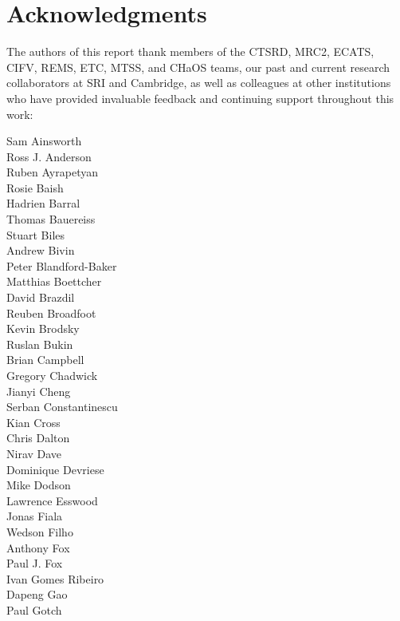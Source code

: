 \section*{Acknowledgments}

\vspace{-0.2cm}

The authors of this report thank members of the CTSRD, MRC2, ECATS,
CIFV, REMS, ETC, MTSS, and CHaOS teams, our past and current research collaborators at SRI and
Cambridge, as well as colleagues at other institutions who have provided
invaluable feedback and continuing support throughout this work:

\medskip

\begin{small}
\noindent\begin{autogrid}{4}
Sam Ainsworth \\
Ross J. Anderson \\
Ruben Ayrapetyan \\
Rosie Baish \\
Hadrien Barral \\
Thomas Bauereiss \\
Stuart Biles \\
Andrew Bivin \\
Peter Blandford-Baker \\
Matthias Boettcher \\
David Brazdil \\
Reuben Broadfoot \\
Kevin Brodsky \\
Ruslan Bukin \\
Brian Campbell \\
Gregory Chadwick \\
Jianyi Cheng \\
Serban Constantinescu \\
Kian Cross \\
Chris Dalton \\
Nirav Dave \\
Dominique Devriese \\
Mike Dodson \\
Lawrence Esswood \\
Jonas Fiala \\
Wedson Filho \\
Anthony Fox \\
Paul J. Fox \\
Ivan Gomes Ribeiro \\
Dapeng Gao \\
Paul Gotch \\

\end{autogrid}
\end{small}
